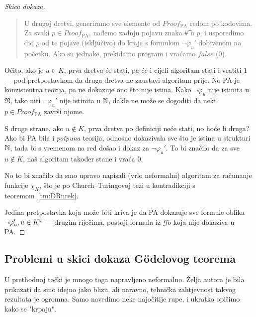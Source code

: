 \begin{proof}[Skica dokaza]
\begin{quote}
    U drugoj dretvi, generiramo sve elemente od $Proof_{\text{PA}}$ redom po kodovima. Za svaki $p\in Proof_{\text{PA}}$, nađemo zadnju pojavu znaka \t\# u $p$, i usporedimo dio $p$ od te pojave (isključivo) do kraja s formulom $\neg\varphi_u'$ dobivenom na početku. Ako su jednake, prekidamo program i vraćamo $\mathit{false}$ ($0$).
\end{quote}

Očito, ako je $u\in K$, prva dretva će stati, pa će i cijeli algoritam stati i vratiti $1$ --- pod pretpostavkom da druga dretva ne zaustavi algoritam prije. No PA je konzistentna teorija, pa ne dokazuje ono što nije istina. Kako $\neg\varphi_u$ nije istinita u $\mathfrak N$, tako niti $\neg\varphi_u'$ nije istinita u ${\mathbb N}$, dakle ne može se dogoditi da neki $p\in Proof_{\text{PA}}$ završi njome.

S druge strane, ako $u\not\in K$, prva dretva po definiciji neće stati, no hoće li druga? Ako bi PA bila i \emph{potpuna} teorija, odnosno dokazivala sve što je istina u strukturi ${\mathbb N}$, tada bi s vremenom na red došao i dokaz za $\neg\varphi_u'$. To bi značilo da za sve $u\not\in K$, naš algoritam također stane i vraća $0$.

No to bi značilo da smo upravo napisali (vrlo neformalni) algoritam za računanje funkcije $\chi_{K}$, što je po Church--\!Turingovoj tezi u kontradikciji s teoremom~\ref{tm:DRnrek}.

Jedina pretpostavka koja može biti kriva je da PA dokazuje sve formule oblika $\neg\varphi_u', u\in K\sp{{\scriptscriptstyle\complement}}$ --- drugim riječima, postoji formula iz $\mathcal G\ddot o$ koja nije dokaziva u PA.
\end{proof}

\subsection{Problemi u skici dokaza G\"odelovog teorema}

U prethodnoj točki je mnogo toga napravljeno neformalno. Želja autora je bila prikazati da smo idejno jako blizu, ali naravno, tehnička zahtjevnost takvog rezultata je ogromna. Samo navedimo neke najočitije rupe, i ukratko opišimo kako se "krpaju".

